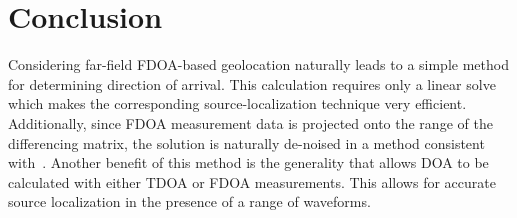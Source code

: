 \section{Conclusion}
\label{s:conclusion}
Considering far-field FDOA-based geolocation naturally leads to a simple method for determining direction of arrival. This calculation requires only a linear solve which makes the corresponding source-localization technique very efficient. Additionally, since FDOA measurement data is projected onto the range of the differencing matrix, the solution is naturally de-noised in a method consistent with~\cite{Schmidt1996,Compagnoni2017}. Another benefit of this method is the generality that allows DOA to be calculated with either TDOA or FDOA measurements. This allows for accurate source localization in the presence of a range of waveforms. 

